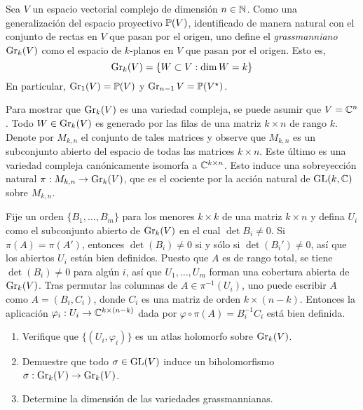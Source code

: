 \begin{exercise}
Sea $V$ un espacio vectorial complejo de dimensión $n \in \N$. Como una generalización del espacio proyectivo $\P(V)$, identificado de manera natural con el conjunto de rectas en $V$ que pasan por el origen, uno define el \textit{grassmanniano} $\Gr_k(V)$ como el espacio de $k$-planos en $V$ que pasan por el origen. Esto es,
$$\Gr_k(V) = \{ W \subset V : \dim W = k \}$$
En particular, $\Gr_1(V) = \P(V)$ y $\Gr_{n-1}{V} = \P(V^\star)$.

Para mostrar que $\Gr_k(V)$ es una variedad compleja, se puede asumir que $V = \C^n$. Todo $W \in \Gr_k(V)$ es generado por las filas de una matriz $k \times n$ de rango $k$. Denote por $M_{k,n}$ el conjunto de tales matrices y observe que $M_{k,n}$ es un subconjunto abierto del espacio de todas las matrices $k \times n$. Este último es una variedad compleja canónicamente isomorfa a $\C^{k \times n}$. Esto induce una sobreyección natural $\pi : M_{k,n} \to \Gr_k(V)$, que es el cociente por la acción natural de $\GL(k, \C)$ sobre $M_{k,n}$.

Fije un orden $\{ B_1, \dots, B_m \}$ para los menores $k \times k$ de una matriz $k \times n$ y defina $U_i$ como el subconjunto abierto de $\Gr_k(V)$ en el cual $\det B_i \ne 0$. Si $\pi(A) = \pi(A')$, entonces $\det(B_i) \ne 0$ si y sólo si $\det(B_i') \ne 0$, así que los abiertos $U_i$ están bien definidos. Puesto que $A$ es de rango total, se tiene $\det(B_i) \ne 0$ para algún $i$, así que $U_1, \dots, U_m$ forman una cobertura abierta de $\Gr_k(V)$. Tras permutar las columnas de $A \in \pi^{-1}(U_i)$, uno puede escribir $A$ como $A = (B_i, C_i)$, donde $C_i$ es una matriz de orden $k \times (n-k)$. Entonces la aplicación $\varphi_i : U_i \to \C^{k \times (n-k)}$ dada por $\varphi \circ \pi(A) = B_i^{-1} C_i$ está bien definida.

\begin{enumerate}[label=\alph*)]
    \item Verifique que $\{ (U_i, \varphi_i) \}$ es un atlas holomorfo sobre $\Gr_k(V)$.
    \item Demuestre que todo $\sigma \in \GL(V)$ induce un biholomorfismo $\sigma : \Gr_k(V) \to \Gr_k(V)$.
    \item Determine la dimensión de las variedades grassmannianas.
\end{enumerate}
\end{exercise}

